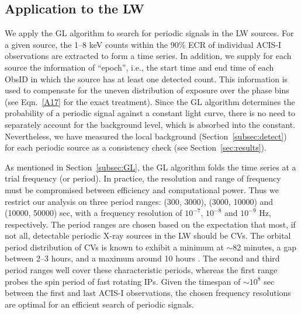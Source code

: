 \documentclass[fleqn,usenatbib]{mnras}
\begin{document}
\subsection{Application to the LW}\label{subsec:appli}
We apply the GL algorithm to search for periodic signals in the LW sources. 
For a given source, the 1--8 keV counts within the 90\% ECR of individual ACIS-I observations are extracted to form a time series.  
In addition, we supply for each source the information of ``epoch'', i.e., the start time and end time of each ObsID in which the source has at least one detected count. This information is used to compensate for the uneven distribution of exposure over the phase bins (see Eqn.~\ref{A17} for the exact treatment). 
Since the GL algorithm determines the probability of a periodic signal against a constant light curve, there is no need to separately account for the background level, which is absorbed into the constant. 
Nevertheless, we have measured the local background (Section~\ref{subsec:detect}) for each periodic source as a consistency check (see Section~\ref{sec:results}). 

As mentioned in Section~\ref{subsec:GL}, the GL algorithm folds the time series at a trial frequency (or period). 
In practice, the resolution and range of frequency must be compromised between efficiency and computational power. %
Thus we restrict our analysis on three period ranges: (300, 3000), (3000, 10000) and (10000, 50000) sec, with a frequency resolution of $10^{-7}$, $10^{-8}$ and $10^{-9}$ Hz, respectively. 
The period ranges are chosen based on the expectation that most, if not all, detectable periodic X-ray sources in the LW should be CVs. 
The orbital period distribution of CVs is known to exhibit a minimum at $\sim$82 minutes, a gap between 2--3 hours, and a maximum around 10 hours 
\citep{2011ApJS..194...28K}.
The second and third period ranges well cover these characteristic periods, whereas the first range probes the spin period of fast rotating IPs.
Given the timespan of $\sim10^8$ sec between the first and last ACIS-I observations, the chosen frequency resolutions are optimal for an efficient search of periodic signals.  
\end{document}
